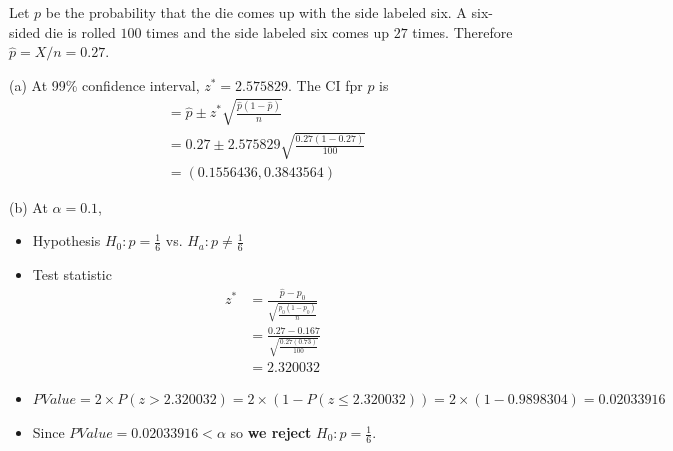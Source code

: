 \documentclass[boxes, qed]{homework}
\begin{document}
\begin{problem}Let $p$ be the probability that the die comes up with the side labeled six. 
  A six-sided die is rolled $100$ times and the side labeled six comes up $27$ times.
  Therefore $\hat{p}=X/n=0.27$.
\end{problem}
\begin{solution}(a) At 99\% confidence interval, $z^*=2.575829$. The CI fpr $p$ is
  \begin{align*}
    &=\hat{p} \pm z^*\sqrt{\frac{\hat{p}(1-\hat{p})}{n}}\\
    &=0.27 \pm 2.575829\sqrt{\frac{0.27(1-0.27)}{100}}\\
    &=(0.1556436,0.3843564)
  \end{align*}

  (b) At $\alpha=0.1$,
  \begin{itemize}
    \item Hypothesis $H_0: p=\frac{1}{6}$ vs. $H_a: p\ne\frac{1}{6}$
    \item Test statistic 
      \begin{align*}
        z^*&=\frac{\hat{p}-p_0}{\sqrt{\frac{p_0(1-p_0)}{n}}}\\
        &=\frac{0.27-0.167}{\sqrt{\frac{0.27(0.73)}{100}}}\\
        &=2.320032
      \end{align*}
    \item $PValue =
      2\times P(z>2.320032) 
      =2\times (1-P(z \le 2.320032))
      =2\times (1-0.9898304)
      =0.02033916
      $
    \item Since $PValue = 0.02033916 < \alpha$ so 
      \textbf{we reject} $H_0: p=\frac{1}{6}$.
  \end{itemize}
\end{solution}
\end{document}
